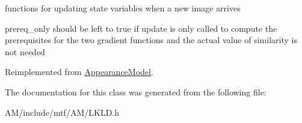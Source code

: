 functions for updating state variables when a new image arrives 

prereq\-\_\-only should be left to true if update is only called to compute the prerequisites for the two gradient functions and the actual value of similarity is not needed 

Reimplemented from \hyperlink{classAppearanceModel_a06136ecd903e85ed2007da2c7b12bd58}{Appearance\-Model}.



The documentation for this class was generated from the following file\-:\begin{DoxyCompactItemize}
\item 
A\-M/include/mtf/\-A\-M/L\-K\-L\-D.\-h\end{DoxyCompactItemize}

